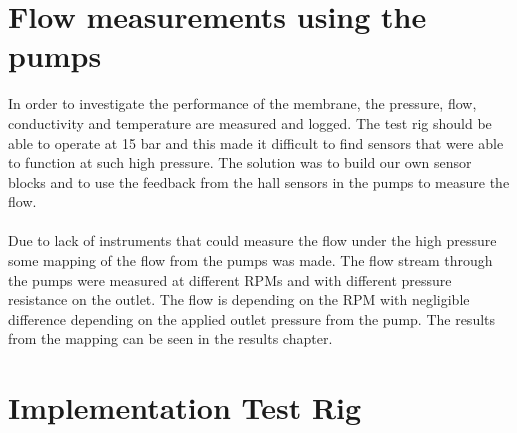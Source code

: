 \section{Flow measurements using the pumps}
In order to investigate the performance of the membrane, the pressure, flow, conductivity and temperature are measured and logged. The test rig should be able to operate at 15 bar and this made it difficult to find sensors that were able to function at such high pressure. The solution was to build our own sensor blocks and to use the feedback from the hall sensors in the pumps to measure the flow. \\
\\
Due to lack of instruments that could measure the flow under the high pressure some mapping of the flow from the pumps was made. The flow stream through the pumps were measured at different RPMs and with different pressure resistance on the outlet. The flow is depending on the RPM with negligible difference depending on the applied outlet pressure from the pump. The results from the mapping can be seen in the results chapter. 

\section{Implementation Test Rig}
